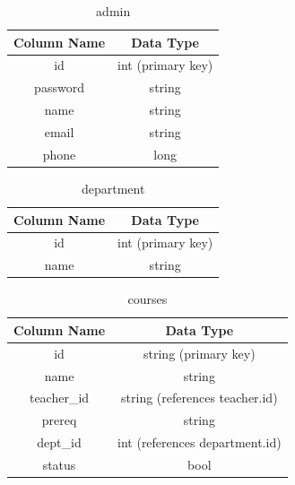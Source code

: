 \documentclass[12pt, a4paper]{article}
\begin{document}
\vspace*{6em}

\begin{table}[H]
	\begin{center}
	\begin{tabular}{c|c}
	\textbf{Column Name} & \textbf{Data Type} \\
	\hline
	id & int (primary key) \\
	password & string \\
	name & string \\
	email & string \\
	phone & long \\
	\end{tabular}
	\end{center}
	\caption{admin}
\end{table}

\begin{table}[H]
	\begin{center}
	\begin{tabular}{c|c}
	\textbf{Column Name} & \textbf{Data Type} \\
	\hline
	id & int (primary key) \\
	name & string \\
	\end{tabular}
	\end{center}
	\caption{department}
\end{table}

\newpage

\begin{table}[H]
	\begin{center}
	\begin{tabular}{c|c}
	\textbf{Column Name} & \textbf{Data Type} \\
	\hline
	id & string (primary key) \\
	name & string \\
	teacher\_id & string (references teacher.id) \\
	prereq & string \\
	dept\_id & int (references department.id) \\
	status & bool
	\end{tabular}
	\end{center}
	\caption{courses}
\end{table}
\end{document}
